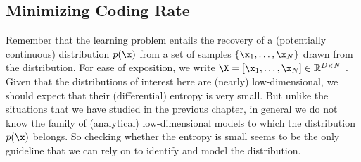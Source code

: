 \documentclass[../../book-main.tex]{subfiles}
\begin{document}
\subsection{Minimizing Coding Rate}\label{sub:min_entropy}
Remember that the learning problem entails the recovery of a (potentially continuous)  distribution $p(\x)$ from a set of samples $\{\x_1, \ldots, \x_N\}$ drawn from the distribution. For ease of exposition, we write $\X = [\x_1, \ldots, \x_N] \in \mathbb{R}^{D\times N}$ . Given that the distributions of interest here are (nearly) low-dimensional, we should expect that their (differential) entropy is very small. But unlike the situations that we have studied in the previous chapter, in general we do not know the family of (analytical) low-dimensional models to which the distribution $p(\x)$ belongs. So checking whether the entropy is small seems to be the only guideline that we can rely on to identify and model the distribution.
\end{document}
